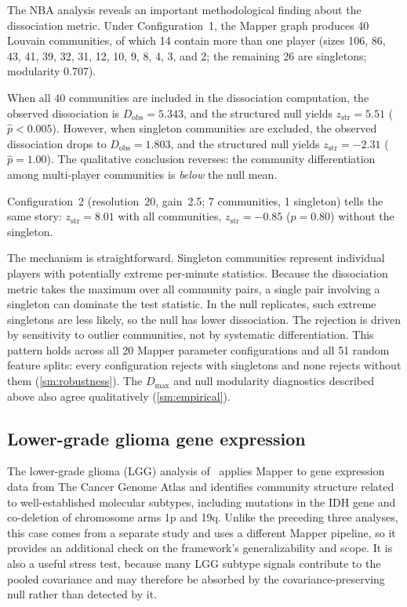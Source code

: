 \documentclass[hidelinks]{siamart251216}
\begin{document}
The NBA analysis reveals an important methodological finding about the
dissociation metric. Under Configuration~1,
the Mapper graph produces 40 Louvain communities, of which 14 contain
more than one player (sizes 106, 86, 43, 41, 39, 32, 31, 12, 10, 9,
8, 4, 3, and 2; the remaining 26 are singletons; modularity 0.707).

When all 40 communities are included in the dissociation computation,
the observed dissociation is $D_{\mathrm{obs}} = 5.343$, and the
structured null yields $z_{\mathrm{str}} = 5.51$ ($\hat{p} < 0.005$).
However, when singleton communities are excluded, the observed
dissociation drops to $D_{\mathrm{obs}} = 1.803$, and the structured
null yields $z_{\mathrm{str}} = -2.31$ ($\hat{p} = 1.00$).  The
qualitative conclusion reverses: the community differentiation among
multi-player communities is \emph{below} the null mean.

Configuration~2 (resolution~20, gain~2.5; 7 communities, 1 singleton)
tells the same story: $z_{\mathrm{str}} = 8.01$ with all communities,
$z_{\mathrm{str}} = -0.85$ ($\hat{p} = 0.80$) without the singleton.

The mechanism is straightforward.  Singleton communities represent
individual players with potentially extreme per-minute statistics.
Because the dissociation metric takes the maximum over all community
pairs, a single pair involving a singleton can dominate the test
statistic.  In the null replicates, such extreme singletons are less
likely, so the null has lower dissociation.  The rejection is driven by
sensitivity to outlier communities, not by systematic differentiation.
This pattern holds across all 20 Mapper parameter configurations and
all 51 random feature splits: every configuration rejects with
singletons and none rejects without them (\cref{sm:robustness}).
The $D_{\max}$ and null modularity diagnostics described above also
agree qualitatively (\cref{sm:empirical}).


\subsection{Lower-grade glioma gene expression}\label{sec:res-lgg}

The lower-grade glioma (LGG) analysis of~\cite{RabadanCamara2020}
applies Mapper to gene expression data from The Cancer Genome Atlas and
identifies community structure related to well-established molecular
subtypes, including mutations in the IDH gene and co-deletion of
chromosome arms 1p and 19q.  Unlike the preceding three analyses, this
case comes from a separate study and uses a different Mapper pipeline,
so it provides an additional check on the framework's generalizability
and scope.  It is also a useful stress test, because many LGG subtype
signals contribute to the pooled covariance and may therefore be
absorbed by the covariance-preserving null rather than detected by it.
\end{document}
